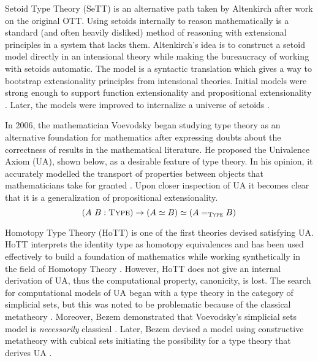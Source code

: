 Setoid Type Theory (SeTT) is an alternative path taken by Altenkirch after work on the original OTT.
Using setoids internally to reason mathematically is a standard (and often heavily disliked) method of reasoning with extensional principles in a system that lacks them.
Altenkirch's idea is to construct a setoid model directly in an intensional theory while making the bureaucracy of working with setoids automatic.
The model is a syntactic translation which gives a way to bootstrap extensionality principles from intensional theories.
Initial models were strong enough to support function extensionality and propositional extensionality \cite{altenkirch2019}.
Later, the models were improved to internalize a universe of setoids \cite{altenkirch2021}.

In 2006, the mathematician Voevodsky began studying type theory as an alternative foundation for mathematics after expressing doubts about the correctness of results in the mathematical literature.
He proposed the Univalence Axiom (UA), shown below, as a desirable feature of type theory.
In his opinion, it accurately modelled the transport of properties between objects that mathematicians take for granted \cite{voevodsky2006}.
Upon closer inspection of UA it becomes clear that it is a generalization of propositional extensionality.
$$(A\ B : \textsc{Type}) \to (A \simeq B) \simeq (A =_\textsc{Type} B)$$

Homotopy Type Theory (HoTT) is one of the first theories devised satisfying UA.
HoTT interprets the identity type as homotopy equivalences and has been used effectively to build a foundation of mathematics while working synthetically in the field of Homotopy Theory \cite{hottbook}.
However, HoTT does not give an internal derivation of UA, thus the computational property, canonicity, is lost.
The search for computational models of UA began with a type theory in the category of simplicial sets, but this was noted to be problematic because of the classical metatheory \cite{kapulkin2012}.
Moreover, Bezem demonstrated that Voevodsky's simplicial sets model is \textit{necessarily} classical \cite{bezem2015}.
Later, Bezem devised a model using constructive metatheory with cubical sets initiating the possibility for a type theory that derives UA \cite{bezem2014}.

